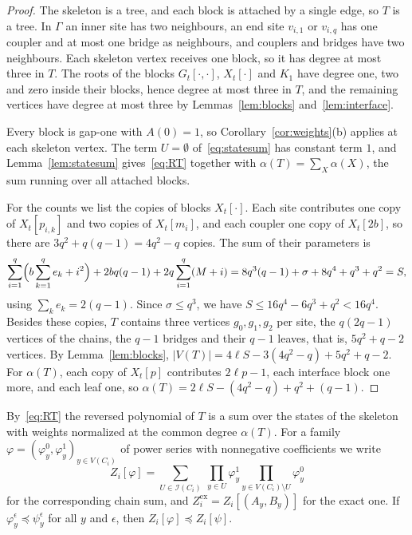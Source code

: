 \documentclass[11pt]{amsart}
\theoremstyle{definition}
\theoremstyle{remark}
\numberwithin{equation}{section}
\newcommand{\cI}{\mathcal{I}}
\begin{document}
\begin{proof}
The skeleton is a tree, and each block is attached by a single edge, so $T$ is a tree. In $\Gamma$ an inner site has two neighbours, an end site $v_{i,1}$ or $v_{i,q}$ has one coupler and at most one bridge as neighbours, and couplers and bridges have two neighbours. Each skeleton vertex receives one block, so it has degree at most three in $T$. The roots of the blocks $G_t[\cdot,\cdot]$, $X_t[\cdot]$ and $K_1$ have degree one, two and zero inside their blocks, hence degree at most three in $T$, and the remaining vertices have degree at most three by Lemmas~\ref{lem:blocks} and~\ref{lem:interface}.

Every block is gap-one with $A(0)=1$, so Corollary~\ref{cor:weights}(b) applies at each skeleton vertex. The term $U=\emptyset$ of~\eqref{eq:statesum} has constant term $1$, and Lemma~\ref{lem:statesum} gives~\eqref{eq:RT} together with $\alpha(T)=\sum_X\alpha(X)$, the sum running over all attached blocks.

For the counts we list the copies of blocks $X_t[\cdot]$. Each site contributes one copy of $X_t[p_{i,k}]$ and two copies of $X_t[m_i]$, and each coupler one copy of $X_t[2b]$, so there are $3q^2+q(q-1)=4q^2-q$ copies. The sum of their parameters is
\[
\sum_{i=1}^q\Bigl(b\sum_{k=1}^qe_k+i^2\Bigr)+2bq(q-1)+2q\sum_{i=1}^q(M+i)=8q^3(q-1)+\sigma+8q^4+q^3+q^2=S,
\]
using $\sum_ke_k=2(q-1)$. Since $\sigma\le q^3$, we have $S\le16q^4-6q^3+q^2<16q^4$. Besides these copies, $T$ contains three vertices $g_0,g_1,g_2$ per site, the $q(2q-1)$ vertices of the chains, the $q-1$ bridges and their $q-1$ leaves, that is, $5q^2+q-2$ vertices. By Lemma~\ref{lem:blocks}, $|V(T)|=4\ell S-3(4q^2-q)+5q^2+q-2$. For $\alpha(T)$, each copy of $X_t[p]$ contributes $2\ell p-1$, each interface block one more, and each leaf one, so $\alpha(T)=2\ell S-(4q^2-q)+q^2+(q-1)$.
\end{proof}

By~\eqref{eq:RT} the reversed polynomial of $T$ is a sum over the states of the skeleton with weights normalized at the common degree $\alpha(T)$. For a family $\varphi=(\varphi^0_y,\varphi^1_y)_{y\in V(C_i)}$ of power series with nonnegative coefficients we write
\[
Z_i[\varphi]=\sum_{U\in\cI(C_i)}\ \prod_{y\in U}\varphi^1_y\prod_{y\in V(C_i)\setminus U}\varphi^0_y
\]
for the corresponding chain sum, and $Z_i^{\mathrm{ex}}=Z_i[(A_y,B_y)]$ for the exact one. If $\varphi_y^\epsilon\preceq\psi_y^\epsilon$ for all $y$ and $\epsilon$, then $Z_i[\varphi]\preceq Z_i[\psi]$.
\end{document}
